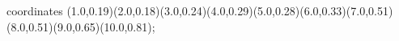 					coordinates { (1.0,0.19)(2.0,0.18)(3.0,0.24)(4.0,0.29)(5.0,0.28)(6.0,0.33)(7.0,0.51)(8.0,0.51)(9.0,0.65)(10.0,0.81)};
